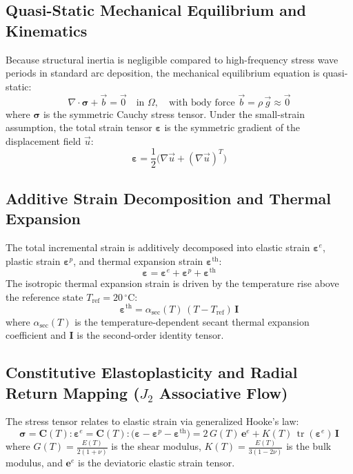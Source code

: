 \documentclass[10pt,a4paper]{article}
\begin{document}
\subsection{Quasi-Static Mechanical Equilibrium and Kinematics}
Because structural inertia is negligible compared to high-frequency stress wave periods in standard arc deposition, the mechanical equilibrium equation is quasi-static:
\begin{equation}
\nabla \cdot \boldsymbol{\sigma} + \vec{b} = \vec{0} \quad \text{in } \Omega, \quad \text{with body force } \vec{b} = \rho\,\vec{g} \approx \vec{0}
\end{equation}
where $\boldsymbol{\sigma}$ is the symmetric Cauchy stress tensor. Under the small-strain assumption, the total strain tensor $\boldsymbol{\varepsilon}$ is the symmetric gradient of the displacement field $\vec{u}$:
\begin{equation}
\boldsymbol{\varepsilon} = \frac{1}{2}\bigl(\nabla \vec{u} + (\nabla \vec{u})^T\bigr)
\end{equation}

\subsection{Additive Strain Decomposition and Thermal Expansion}
The total incremental strain is additively decomposed into elastic strain $\boldsymbol{\varepsilon}^e$, plastic strain $\boldsymbol{\varepsilon}^p$, and thermal expansion strain $\boldsymbol{\varepsilon}^{\mathrm{th}}$:
\begin{equation}
\boldsymbol{\varepsilon} = \boldsymbol{\varepsilon}^e + \boldsymbol{\varepsilon}^p + \boldsymbol{\varepsilon}^{\mathrm{th}}
\end{equation}
The isotropic thermal expansion strain is driven by the temperature rise above the reference state $T_{\mathrm{ref}} = 20\,^\circ\mathrm{C}$:
\begin{equation}
\boldsymbol{\varepsilon}^{\mathrm{th}} = \alpha_{\mathrm{sec}}(T)\,(T - T_{\mathrm{ref}})\,\mathbf{I}
\end{equation}
where $\alpha_{\mathrm{sec}}(T)$ is the temperature-dependent secant thermal expansion coefficient and $\mathbf{I}$ is the second-order identity tensor.

\subsection{Constitutive Elastoplasticity and Radial Return Mapping ($J_2$ Associative Flow)}
The stress tensor relates to elastic strain via generalized Hooke's law:
\begin{equation}
\boldsymbol{\sigma} = \mathbf{C}(T) : \boldsymbol{\varepsilon}^e = \mathbf{C}(T) : \bigl(\boldsymbol{\varepsilon} - \boldsymbol{\varepsilon}^p - \boldsymbol{\varepsilon}^{\mathrm{th}}\bigr) = 2\,G(T)\,\mathbf{e}^e + K(T)\,\operatorname{tr}(\boldsymbol{\varepsilon}^e)\,\mathbf{I}
\end{equation}
where $G(T) = \frac{E(T)}{2(1+\nu)}$ is the shear modulus, $K(T) = \frac{E(T)}{3(1-2\nu)}$ is the bulk modulus, and $\mathbf{e}^e$ is the deviatoric elastic strain tensor.
\end{document}

